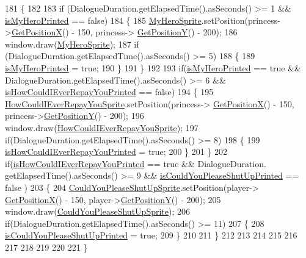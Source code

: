 \begin{DoxyCode}
181 \{
182 
183     \textcolor{keywordflow}{if} (DialogueDuration.getElapsedTime().asSeconds() >= 1 && \hyperlink{classDialogue_a463330f42c3ff13d9e8e99e29eb726eb}{isMyHeroPrinted} == \textcolor{keyword}{false})
184     \{
185         \hyperlink{classDialogue_aeb353262e86c8d42069a7af417f47741}{MyHeroSprite}.setPosition(princess->\hyperlink{classPrincessObject_a8fe6db722d044576a107ebed4d9efd90}{GetPositionX}() - 150, princess->
      \hyperlink{classPrincessObject_ab467215d25ae8ea54e55888fc78222db}{GetPositionY}() - 200);
186         window.draw(\hyperlink{classDialogue_aeb353262e86c8d42069a7af417f47741}{MyHeroSprite});
187         \textcolor{keywordflow}{if} (DialogueDuration.getElapsedTime().asSeconds() >= 5)
188         \{
189             \hyperlink{classDialogue_a463330f42c3ff13d9e8e99e29eb726eb}{isMyHeroPrinted} = \textcolor{keyword}{true};
190         \}
191     \}
192 
193     \textcolor{keywordflow}{if}(\hyperlink{classDialogue_a463330f42c3ff13d9e8e99e29eb726eb}{isMyHeroPrinted} == \textcolor{keyword}{true} && DialogueDuration.getElapsedTime().asSeconds() >= 6 && 
      \hyperlink{classDialogue_a73db3d32db589709bda5de4a51dc941a}{isHowCouldIEverRepayYouPrinted} == \textcolor{keyword}{false})
194     \{
195         \hyperlink{classDialogue_a61430da086ec5f95b81faae24885b3f2}{HowCouldIEverRepayYouSprite}.setPosition(princess->
      \hyperlink{classPrincessObject_a8fe6db722d044576a107ebed4d9efd90}{GetPositionX}() - 150, princess->\hyperlink{classPrincessObject_ab467215d25ae8ea54e55888fc78222db}{GetPositionY}() - 200);
196         window.draw(\hyperlink{classDialogue_a61430da086ec5f95b81faae24885b3f2}{HowCouldIEverRepayYouSprite});
197         \textcolor{keywordflow}{if}(DialogueDuration.getElapsedTime().asSeconds() >= 8)
198         \{
199             \hyperlink{classDialogue_a73db3d32db589709bda5de4a51dc941a}{isHowCouldIEverRepayYouPrinted} = \textcolor{keyword}{true};
200         \}
201     \}
202     \textcolor{keywordflow}{if}(\hyperlink{classDialogue_a73db3d32db589709bda5de4a51dc941a}{isHowCouldIEverRepayYouPrinted} == \textcolor{keyword}{true} && DialogueDuration.
      getElapsedTime().asSeconds() >= 9 && \hyperlink{classDialogue_aec5f0f752dfe066658be15ad55e7cc18}{isCouldYouPleaseShutUpPrinted} == false )
203     \{
204         \hyperlink{classDialogue_afb2613f4ba14a82702345cbdcd6dcb95}{CouldYouPleaseShutUpSprite}.setPosition(player->
      \hyperlink{classPlayerObject_aa84a7779304b680fa32b88b01ba95d02}{GetPositionX}() - 150, player->\hyperlink{classPlayerObject_ad17b9ec44299f4dc9ca20064c883496b}{GetPositionY}() - 200);
205         window.draw(\hyperlink{classDialogue_afb2613f4ba14a82702345cbdcd6dcb95}{CouldYouPleaseShutUpSprite});
206         \textcolor{keywordflow}{if}(DialogueDuration.getElapsedTime().asSeconds() >= 11)
207         \{
208             \hyperlink{classDialogue_aec5f0f752dfe066658be15ad55e7cc18}{isCouldYouPleaseShutUpPrinted} = \textcolor{keyword}{true};
209         \}
210 
211     \}
212 
213 
214 
215 
216 
217 
218 
219 
220 
221 \}
\end{DoxyCode}
